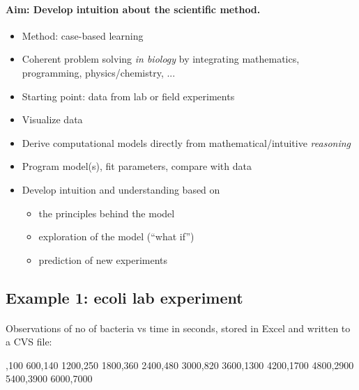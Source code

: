 \documentclass[%
twoside,                 %
final,                   %
10pt]{article}
\begin{document}
\paragraph{Aim: Develop intuition about the scientific method.}
\begin{itemize}
 \item Method: case-based learning

 \item Coherent problem solving \emph{in biology} by integrating
   mathematics, programming, physics/chemistry, ...

 \item Starting point: data from lab or field experiments

 \item Visualize data

 \item Derive computational models directly from mathematical/intuitive \emph{reasoning}

 \item Program model(s), fit parameters, compare with data

 \item Develop intuition and understanding based on
\begin{itemize}

  \item the principles behind the model

  \item exploration of the model (``what if'')

  \item prediction of new experiments
\end{itemize}

\noindent
\end{itemize}

\noindent



\subsection{Example 1: ecoli lab experiment}


\paragraph{}
Observations of no of bacteria vs time in seconds,
stored in Excel and written to a CVS file:

,100
600,140
1200,250
1800,360
2400,480
3000,820
3600,1300
4200,1700
4800,2900
5400,3900
6000,7000
\etxt
\end{document}
